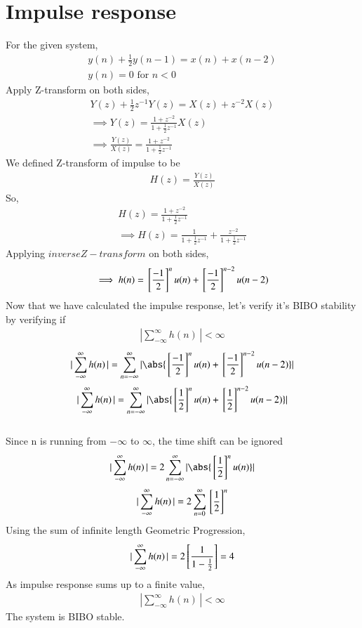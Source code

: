 \documentclass[journal,12pt,twocolumn]{IEEEtran}
\begin{document}
\section{Impulse response}
For the given system,
\begin{align}
    y(n)+\frac{1}{2}y(n-1) = x(n)+x(n-2) \\
    y(n)=0 \text{ for }n<0
\end{align}
Apply Z-transform on both sides,
\begin{align}
    Y(z) + \frac{1}{2}z^{-1}Y(z)=X(z) + z^{-2}X(z)\\
    \implies Y(z)=\frac{1+z^{-2}}{1+\frac{1}{2}z^{-1}}X(z)\\
    \implies \frac{Y(z)}{X(z)}=\frac{1+z^{-2}}{1+\frac{1}{2}z^{-1}}
\end{align}
We defined Z-transform of impulse to be 
\begin{align}
    H(z) = \frac{Y(z)}{X(z)}
\end{align}
So,
\begin{align}
    H(z) = \frac{1+z^{-2}}{1+\frac{1}{2}z^{-1}}\\
    \implies H(z) = \frac{1}{1+\frac{1}{2}z^{-1}} + \frac{z^{-2}}{1+\frac{1}{2}z^{-1}}
\end{align}
Applying $inverse Z-transform$ on both sides,
\begin{align}
\implies h(n)={}\left[\frac{-1}{2}\right]^nu(n) + {}\left[\frac{-1}{2}\right]^{n-2}u(n-2)
\end{align}
Now that we have calculated the impulse response, let's verify it's BIBO stability by verifying if
\begin{align}
    |\sum_{-\infty}^{\infty}h(n)\,| < \infty 
\end{align}
\begin{align}
    |\sum_{-\infty}^{\infty}h(n)\,| =
    \sum_{n=-\infty}^{\infty}|\abs{\sbrak{\frac{-1}{2}}^nu(n) + \sbrak{\frac{-1}{2}}^{n-2}u(n-2)}| 
\end{align}
\begin{align}
    |\sum_{-\infty}^{\infty}h(n)\,| = \sum_{n=-\infty}^{\infty}|\abs{\sbrak{\frac{1}{2}}^nu(n) + \sbrak{\frac{1}{2}}^{n-2}u(n-2)}|
\end{align}
\\Since n is running from $-\infty$ to $\infty$, the time shift can be ignored
\begin{align}
    |\sum_{-\infty}^{\infty}h(n)\,| = 2\sum_{n=-\infty}^{\infty}|\abs{\sbrak{\frac{1}{2}}^nu(n)}|
\end{align}
\begin{align}
    |\sum_{-\infty}^{\infty}h(n)\,| = 2\sum_{n=0}^{\infty}{{}\left[\frac{1}{2}\right]^n}
\end{align}
Using the sum of infinite length Geometric Progression,
\begin{align}
    |\sum_{-\infty}^{\infty}h(n)\,| = 2{}\left[\frac{1}{1-\frac{1}{2}}\right] 
    = 4
\end{align}
As impulse response sums up to a finite value,
\begin{align}
|\sum_{-\infty}^{\infty}h(n)\,| < \infty
\end{align}
The system is BIBO stable.\\ 
\end{document}
